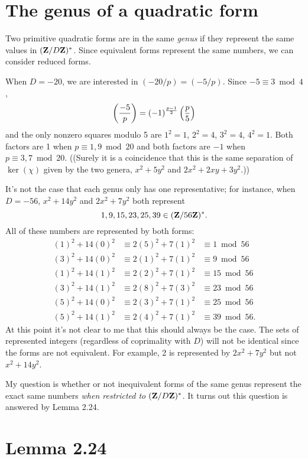 

\section{The genus of a quadratic form}

Two primitive quadratic forms are in the same \emph{genus} if they represent the same values in $(\mathbf{Z}/D\mathbf{Z})^*$. Since equivalent forms represent the same numbers, we can consider reduced forms.

When $D=-20$, we are interested in $(-20/p) = (-5/p)$. Since $-5\equiv 3\bmod 4$,
\[\left(\frac{-5}{p}\right)=(-1)^\frac{p-1}{2}\left(\frac{p}{5}\right)\]
and the only nonzero squares modulo 5 are $1^2=1$, $2^2=4$, $3^2=4$, $4^2=1$. Both factors are 1 when $p\equiv 1, 9\bmod 20$ and both factors are $-1$ when $p\equiv 3, 7\bmod 20$. ((Surely it is a coincidence that this is the same separation of $\ker(\chi)$ given by the two genera, $x^2+5y^2$ and $2x^2+2xy+3y^2$.))

It's not the case that each genus only has one representative; for instance, when $D=-56$, $x^2+14y^2$ and $2x^2+7y^2$ both represent
\[1, 9, 15, 23, 25, 39\in (\mathbf{Z}/56\mathbf{Z})^*.\]
All of these numbers are represented by both forms:
\begin{align*}
(1)^2 + 14(0)^2 &\equiv 2(5)^2+7(1)^2 &\equiv 1\bmod 56\\
(3)^2 + 14(0)^2 &\equiv 2(1)^2+7(1)^2 &\equiv 9\bmod 56\\
(1)^2 + 14(1)^2 &\equiv 2(2)^2+7(1)^2 &\equiv 15\bmod 56\\
(3)^2 + 14(1)^2 &\equiv 2(8)^2+7(3)^2 &\equiv 23\bmod 56\\
(5)^2 + 14(0)^2 &\equiv 2(3)^2+7(1)^2 &\equiv 25\bmod 56\\
(5)^2 + 14(1)^2 &\equiv 2(4)^2+7(1)^2 &\equiv 39\bmod 56.
\end{align*}
At this point it's not clear to me that this should always be the case. The sets of represented integers (regardless of coprimality with $D$) will not be identical since the forms are not equivalent. For example, 2 is represented by $2x^2+7y^2$ but not $x^2+14y^2$.

My question is whether or not inequivalent forms of the same genus represent the exact same numbers \emph{when restricted to $(\mathbf{Z}/D\mathbf{Z})^*$}. It turns out this question is answered by Lemma 2.24.

\section{Lemma 2.24}

